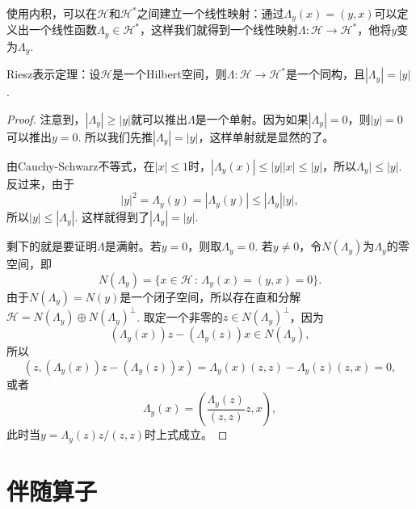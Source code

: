 使用内积，可以在$\mathcal{H}$和$\mathcal{H}^*$之间建立一个线性映射：通过$\Lambda_y(x)=(y,x)$可以定义出一个线性函数$\Lambda_y\in \mathcal{H}^*$，这样我们就得到一个线性映射$\Lambda:\mathcal{H}\to \mathcal{H}^*$，他将$y$变为$\Lambda_{y}$.

\begin{thm}
Riesz表示定理：设$\mathcal{H}$是一个Hilbert空间，则$\Lambda:\mathcal{H}\to \mathcal{H}^*$是一个同构，且$|\Lambda_y|=|y|$.
\end{thm}

\begin{proof}
	注意到，$|\Lambda_y|\geq |y|$就可以推出$\Lambda$是一个单射。因为如果$|\Lambda_y|=0$，则$|y|=0$可以推出$y=0$. 所以我们先推$|\Lambda_y|=|y|$，这样单射就是显然的了。

	由Cauchy-Schwarz不等式，在$|x|\leq 1$时，$|\Lambda_y(x)|\leq |y||x|\leq |y|$，所以$\Lambda_y|\leq |y|$. 反过来，由于
	\[
		|y|^2=\Lambda_y(y)=|\Lambda_y(y)|\leq |\Lambda_y||y|,
	\]
	所以$|y|\leq |\Lambda_y|$. 这样就得到了$|\Lambda_y|=|y|$. 

	剩下的就是要证明$\Lambda$是满射。若$y=0$，则取$\Lambda_y=0$. 若$y\neq 0$，令$N(\Lambda_y)$为$\Lambda_y$的零空间，即
	\[
		N(\Lambda_y)=\bigl\{x\in\mathcal{H}\,:\, \Lambda_y(x)=(y,x)=0\bigr\}.
	\]
	由于$N(\Lambda_y)=N(y)$是一个闭子空间，所以存在直和分解$\mathcal{H}=N(\Lambda_y)\oplus N(\Lambda_y)^\bot$. 取定一个非零的$z\in N(\Lambda_y)^\bot$，因为
	\[
		(\Lambda_y(x))z-(\Lambda_y(z))x\in N(\Lambda_y),
	\]
	所以
	\[
		(z,(\Lambda_y(x))z-(\Lambda_y(z))x)=\Lambda_y(x)(z,z)-\Lambda_y(z)(z,x)=0,
	\]
	或者
	\[
		\Lambda_y(x)=\left(\frac{\Lambda_y(z)}{(z,z)}z,x\right),
	\]
	此时当$y=\Lambda_y(z)z/(z,z)$时上式成立。
\end{proof}

\section{伴随算子}